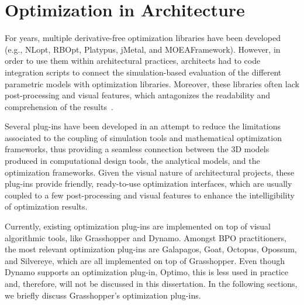 	
	\section{Optimization in Architecture}	
	\label{sec:optimizationtools}
	
	For years, multiple derivative-free optimization libraries have been developed (e.g., NLopt, RBOpt, Platypus, jMetal, and MOEAFramework). However, in order to use them within architectural practices, architects had to code integration scripts to connect the simulation-based evaluation of the different parametric models with optimization libraries. Moreover, these libraries often lack post-processing and visual features, which antagonizes the readability and comprehension of the results~\cite{Attia2013,Nguyen2014}.
	
	Several plug-ins have been developed in an attempt to reduce the limitations associated to the coupling of simulation tools and mathematical optimization frameworks, thus providing a seamless connection between the 3D models produced in computational design tools, the analytical models, and the optimization frameworks. Given the visual nature of architectural projects, these plug-ins provide friendly, ready-to-use optimization interfaces, which are usually coupled to a few post-processing and visual features to enhance the intelligibility of optimization results. 
	
	Currently, existing optimization plug-ins are implemented on top of visual algorithmic tools, like Grasshopper and Dynamo. Amongst \ac{BPO} practitioners, the most relevant optimization plug-ins are Galapagos, Goat, Octopus, Opossum, and Silvereye, which are all implemented on top of Grasshopper. Even though Dynamo supports an optimization plug-in, Optimo, this is less used in practice and, therefore, will not be discussed in this dissertation. In the following sections, we briefly discuss Grasshopper's optimization plug-ins. 
	
